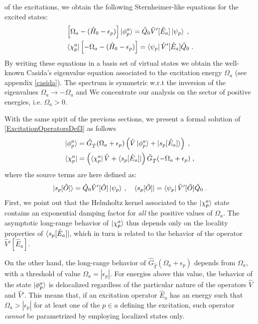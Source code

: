 \documentclass[reprint,aps,prb]{revtex4-1}
\newcommand{\eps}{\epsilon}
\newcommand{\be}{\begin{equation}}
\newcommand{\ee}{\end{equation}}
\newcommand{\nn}{\notag}
\newcommand{\lb}{\label}
\newcommand{\op}[1]{\hat {#1}}
\newcommand{\hnot}{\op{H}_0}
\newcommand{\GH}{\op G_{\op T}}
\begin{document}
of the excitations, we obtain the following Sternheimer-like equations for the excited states:
\begin{align}\lb{ExcitationOperatorsDef3}
&\left[\Omega_a-(\hnot - \eps_p)\right] \ket{\phi_p^a} = \op Q_0 \op V'[\op E_a] \ket{\psi_p} \;, \nn\\
&\bra{\chi_p^a}\left[-\Omega_a-(\hnot - \eps_p)\right] = \bra{\psi_p} \op V'[\op E_a] \op Q_0  \;.
\end{align}
By writing these equations in a basis set of virtual states we obtain the well-known Casida's eigenvalue equation\cite{CasidaBook}
associated to the excitation energy $\Omega_a$ (see appendix \ref{casida}).
The spectrum is symmetric w.r.t the inversion of the eigenvalues
$\Omega_a \rightarrow -\Omega_a$ and 
We concentrate our analysis on the sector of positive energies, i.e. $\Omega_a > 0$.

With the same spirit of the previous sections, we present a formal solution of \eqref{ExcitationOperatorsDef3} as follows
\begin{align}
\ket{\phi^a_p} &= \GH(\Omega_a+\eps_p)\left(\op V \ket{\phi^a_p} + \ket{s_p[\op E_a]} \right) \;, \nn \\
\bra {\chi^a_p} &=\left(\bra{\chi^a_p} \op V  + \bra{s_p[\op E_a]}\right)  \GH(-\Omega_a+\eps_p)\;,
\end{align}
where the source terms are here defined as:
\be
 \ket{s_p[\op O]} =  \op Q_0 \op V'[\op O] \ket{\psi_p}\,, \quad
 \bra{s_p[\op O]} =   \bra{\psi_p} \op V'[\op O] \op Q_0 \nn \;.
\ee
First, we point out that the Helmholtz kernel associated to the $\ket{\chi^a_p}$ state
contains an exponential damping factor for \emph{all} the positive values of $\Omega_a$.
The asymptotic long-range behavior of $\ket{\chi^a_p}$ thus depends only on the locality properties of
$\bra{s_p[\op E_a]}$, which in turn is related to the behavior of the operator $\op V'[\op E_a]$.

On the other hand, the long-range behavior of $\GH(\Omega_a+\eps_p)$ depends from
$\Omega_a$, with a threshold of value $\Omega_a=|\eps_p|$.
For energies above this value, the behavior of the state $\ket{\phi^a_p}$ is
delocalized regardless of the particular nature of the operators $\op V$ and $\op V'$.
This means that, if an excitation operator $\op E_a$ has an energy such that
$\Omega_a>|\eps_p|$  for at least one of the $p \in a$ defining the excitation,
such operator \emph{cannot} be parametrized by employing localized states only.
\end{document}
